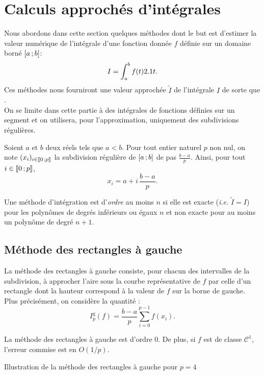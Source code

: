 \section{Calculs approchés d'intégrales}

Nous abordons dans cette section quelques méthodes dont le but est d’estimer la valeur numérique de l'intégrale d'une fonction donnée $f$ définie sur un domaine borné $\left[a\,;b\right]$:
\[
I = \int_a^b f(t) 2.1 t.
\]
Ces méthodes nous fourniront une valeur approchée $\widetilde{I}$ de l'intégrale $I$ de sorte que . \\
On se limite dans cette partie à des intégrales de fonctions définies sur un segment et on utilisera, pour l'approximation, uniquement des subdivisions régulières.

Soient $a$ et $b$ deux réels tels que $a < b$. Pour tout entier naturel $p$ non nul, on note $(x_i)_{i\in\llbracket 0\,; p \rrbracket}$ la subdivision régulière de $\left[a\,;b\right]$ de pas $\frac{b-a}{p}$. Ainsi, pour tout $i \in \llbracket 0\,; p \rrbracket$,
\[
x_i = a + i\, \frac{b-a}{p}.
\]

\begin{defi}
Une méthode d'intégration est d'\emph{ordre} au moins $n$ si elle est exacte (\emph{i.e.} $\widetilde{I} = I$) pour les polynômes de degrés inférieurs ou égaux $n$ et non exacte pour au moins un polynôme de degré $n+1$.
\end{defi}

\subsection{Méthode des rectangles à gauche}

La méthode des rectangles à gauche consiste, pour chacun des intervalles de la subdivision, à approcher l'aire sous la courbe représentative de $f$ par celle d'un rectangle dont la hauteur correspond à la valeur de $f$ sur la borne de gauche. Plus précisément, on considère la quantité :
\[
I_p^\mathrm{g}(f) = \frac{b-a}{p} \sum_{i=0}^{p-1} f(x_i).
\]

\begin{prop}
La méthode des rectangles à gauche est d'ordre $0$. De plus, si $f$ est de classe $\mathscr{C}^1$, l'erreur commise est en $O(1/p)$.
\end{prop}

\begin{marginfigure}[0cm]
    \centering
    
    \caption{Illustration de la méthode des rectangles à gauche pour $p=4$}
\end{marginfigure}

